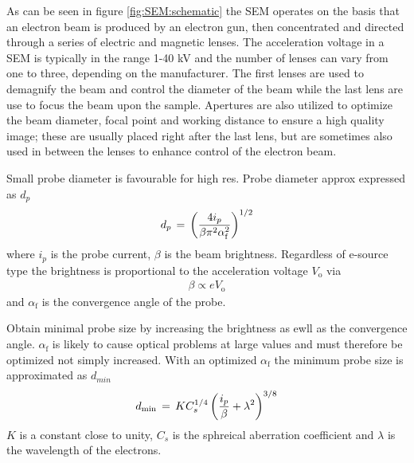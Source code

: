 {As can be seen in figure \ref{fig:SEM:schematic} the SEM operates on the basis that an electron beam is produced by an electron gun, then concentrated and directed through a series of electric and magnetic lenses. The acceleration voltage in a SEM is typically in the range 1-40 kV and the number of lenses can vary from one to three, depending on the manufacturer. The first lenses are used to demagnify the beam and control the diameter of the beam while the last lens are use to focus the beam upon the sample. Apertures are also utilized to optimize the beam diameter, focal point and working distance to ensure a high quality image; these are usually placed right after the last lens, but are sometimes also used in between the lenses to enhance control of the electron beam.



Small probe diameter is favourable for high res. Probe diameter approx expressed as $d_p$
\begin{align*}
d_p \,=\, \left( 
\dfrac{4i_p}{\beta \pi^2\alpha_\text{f}^2}
 \right)^{1/2}
\end{align*}
where $i_p$ is the probe current, $\beta$ is the beam brightness. Regardless of e-source type the brightness is proportional to the acceleration voltage $V_{\text{o}}$ via 
\begin{align*}
\beta\propto e V_{\text{o}}
\end{align*}
and $\alpha_{\text{f}}$ is the convergence angle of the probe. 

Obtain minimal probe size by increasing the brightness as ewll as the convergence angle. $\alpha_{\text{f}}$ is likely to cause optical problems at large values and must therefore be optimized not simply increased. With an optimized $\alpha_{\text{f}}$ the minimum probe size is approximated as $d_{min}$
\begin{align*}
d_{\text{min}}\,=\, KC_s^{1/4}\left( \dfrac{i_p}{\beta}+\lambda^2 \right)^{3/8}
\end{align*}
$K$ is a constant close to unity, $C_s$ is the sphreical aberration coefficient and $\lambda$ is the wavelength of the electrons. 






}